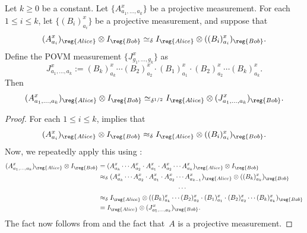 \begin{fact}\label{fact:sandwich}
Let $k \geq 0$ be a constant.
Let $\{A^x_{a_1, \ldots, a_k}\}$ be a projective measurement.
For each $1 \leq i \leq k$, let $\{(B_i)^x_{a_i}\}$ be a projective measurement, and suppose that
\begin{equation}\label{eq:no-take-only-throw}
(A^x_{a_i})_{\reg{Alice}} \otimes I_{\reg{Bob}} \simeq_{\delta} I_{\reg{Alice}} \otimes ((B_i)^x_{a_i})_{\reg{Bob}}.
\end{equation}
Define the POVM measurement $\{J^x_{g_1, \ldots, g_k}\}$ as
\begin{equation*}
J^x_{a_1, \ldots, a_k} := (B_k)^x_{a_k} \cdots (B_2)^x_{a_2} \cdot (B_1)^x_{a_1} \cdot (B_2)^x_{a_2} \cdots (B_k)^x_{a_k}.
\end{equation*}
Then
\begin{equation*}
(A^x_{a_1, \ldots, a_k})_{\reg{Alice}} \otimes I_{\reg{Bob}} \simeq_{\delta^{1/2}} I_{\reg{Alice}} \otimes (J^x_{a_1, \ldots, a_k})_{\reg{Bob}}.
\end{equation*}
\end{fact}
\begin{proof}
For each $1 \leq i \leq k$, 
 implies that
\begin{equation*}
(A^x_{a_i})_{\reg{Alice}} \otimes I_{\reg{Bob}} \approx_{\delta} I_{\reg{Alice}} \otimes ((B_i)^x_{a_i})_{\reg{Bob}}.
\end{equation*}
Now, we repeatedly apply this using :
\begin{align*}
(A^x_{a_1, \ldots, a_k})_{\reg{Alice}} \otimes I_{\reg{Bob}}
& = (A^x_{a_k} \cdots A^x_{a_2} \cdot A^x_{a_1} \cdot A^x_{a_2} \cdots A^x_{a_{k}})_{\reg{Alice}} \otimes I_{\reg{Bob}}\\
& \approx_{\delta} (A^x_{a_k} \cdots A^x_{a_2} \cdot A^x_{a_1} \cdot A^x_{a_2} \cdots A^x_{a_{k-1}})_{\reg{Alice}} \otimes ((B_k)^x_{a_k})_{\reg{Bob}}\\
&\qquad\qquad\qquad \qquad \qquad \qquad \cdots\\
& \approx_{\delta} I_{\reg{Alice}} \otimes ((B_k)^x_{a_k} \cdots (B_2)^x_{a_2} \cdot (B_1)^x_{a_1} \cdot (B_2)^x_{a_2} \cdots (B_k)^x_{a_k})_{\reg{Bob}}\\
& = I_{\reg{Alice}} \otimes (J^x_{a_1, \ldots, a_k})_{\reg{Bob}}.
\end{align*}
The fact now follows from  and the fact that~$A$ is a projective measurement.
\end{proof}

